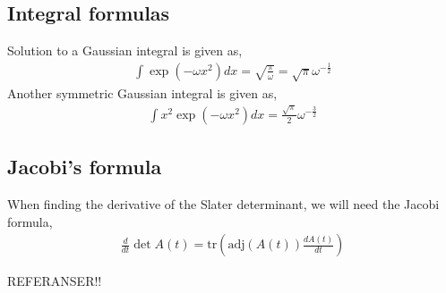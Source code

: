 \documentclass[11pt]{article}
\newcommand{\husk}[1]{\color{red} #1 \color{black}}
\begin{document}
\subsection{Integral formulas}
Solution to a Gaussian integral is given as,
\begin{align}
	\int \exp\left( - \omega x^2 \right) d x = \sqrt{\frac{\pi}{\omega}} = \sqrt{\pi}\omega^{-\frac{1}{2}}
	\label{eq:gaussian-integral}
\end{align}
Another symmetric Gaussian integral is given as,
\begin{align}
	\int x^2 \exp\left( - \omega x^2 \right) d x = \frac{\sqrt{\pi}}{2}\omega^{-\frac{3}{2}}
	\label{eq:gaussian-integral-x-squared}
\end{align}
\subsection{Jacobi's formula}
When finding the derivative of the Slater determinant, we will need the Jacobi formula,
\begin{align}
	\frac{d}{dt}\det A(t) = \mathrm{tr} \left( \mathrm{adj}(A(t))\frac{dA(t)}{dt} \right)
	\label{eq:jacobi-formula}
\end{align}

\husk{REFERANSER!!}
\end{document}

